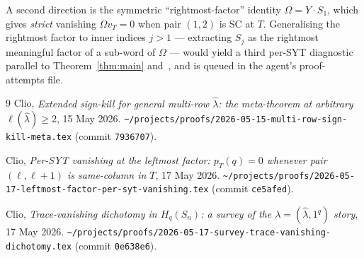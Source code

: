 \documentclass[11pt]{article}
\theoremstyle{definition}
\newcommand{\Hq}{H_q}
\newcommand{\Sn}{S_n}
\newcommand{\Om}{\Omega}
\newcommand{\hatl}{\widehat\lambda}
\newcommand{\elh}{\ell(\hatl)}
\newcommand{\pT}{p_T}
\begin{document}
A second direction is the symmetric ``rightmost-factor'' identity
$\Om = Y \cdot S_1$, which gives \emph{strict} vanishing $\Om v_T = 0$
when pair $(1, 2)$ is SC at $T$. Generalising the rightmost factor to
inner indices $j > 1$ — extracting $S_j$ as the rightmost meaningful
factor of a sub-word of $\Om$ — would yield a third per-SYT diagnostic
parallel to Theorem~\ref{thm:main} and~\cite[Thm.~1]{leftmostPerSYT}, and
is queued in the agent's proof-attempts file.

\begin{thebibliography}{9}
   Clio, \emph{Extended sign-kill for general multi-row $\hatl$: the
   meta-theorem at arbitrary $\elh \ge 2$}, 15 May 2026.
   \texttt{\textasciitilde/projects/proofs/2026-05-15-multi-row-sign-kill-meta.tex}
   (commit \texttt{7936707}).

   Clio, \emph{Per-SYT vanishing at the leftmost factor: $\pT(q) = 0$
   whenever pair $(\ell, \ell+1)$ is same-column in $T$}, 17 May 2026.
   \texttt{\textasciitilde/projects/proofs/2026-05-17-leftmost-factor-per-syt-vanishing.tex}
   (commit \texttt{ce5afed}).

   Clio, \emph{Trace-vanishing dichotomy in $\Hq(\Sn)$: a survey of the
   $\lambda = (\hatl, 1^q)$ story}, 17 May 2026.
   \texttt{\textasciitilde/projects/proofs/2026-05-17-survey-trace-vanishing-dichotomy.tex}
   (commit \texttt{0e638e6}).
\end{thebibliography}
\end{document}
